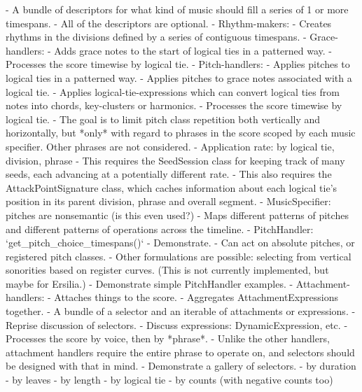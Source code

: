 \begin{markdown}
-   A bundle of descriptors for what kind of music should fill a series of
    1 or more timespans.
-   All of the descriptors are optional.
-   Rhythm-makers:
    -   Creates rhythms in the divisions defined by a series of contiguous
        timespans.
-   Grace-handlers:
    -   Adds grace notes to the start of logical ties in a patterned way.
    -   Processes the score timewise by logical tie.
-   Pitch-handlers:
    -   Applies pitches to logical ties in a patterned way.
    -   Applies pitches to grace notes associated with a logical tie.
    -   Applies logical-tie-expressions which can convert logical ties from
        notes into chords, key-clusters or harmonics.
    -   Processes the score timewise by logical tie.
        -   The goal is to limit pitch class repetition both vertically and
            horizontally, but *only* with regard to phrases in the score scoped
            by each music specifier. Other phrases are not considered.
    -   Application rate: by logical tie, division, phrase
        -   This requires the SeedSession class for keeping track of many
            seeds, each advancing at a potentially different rate.
        -   This also requires the AttackPointSignature class, which caches
            information about each logical tie's position in its parent
            division, phrase and overall segment.
    -   MusicSpecifier: pitches are nonsemantic (is this even used?)
    -   Maps different patterns of pitches and different patterns of operations
        across the timeline.
        -   PitchHandler: `get_pitch_choice_timespans()`
        -   Demonstrate.
    -   Can act on absolute pitches, or registered pitch classes.
    -   Other formulations are possible: selecting from vertical sonorities
        based on register curves. (This is not currently implemented, but maybe
        for Ersilia.)
    -   Demonstrate simple PitchHandler examples.
-   Attachment-handlers:
    -   Attaches things to the score.
    -   Aggregates AttachmentExpressions together.
        -   A bundle of a selector and an iterable of attachments or
            expressions.
        -   Reprise discussion of selectors.
        -   Discuss expressions: DynamicExpression, etc.
    -   Processes the score by voice, then by *phrase*.
        -   Unlike the other handlers, attachment handlers require the entire
            phrase to operate on, and selectors should be designed with that in
            mind.
    -   Demonstrate a gallery of selectors.
        -   by duration
        -   by leaves
        -   by length
        -   by logical tie
        -   by counts (with negative counts too)

\end{markdown}
